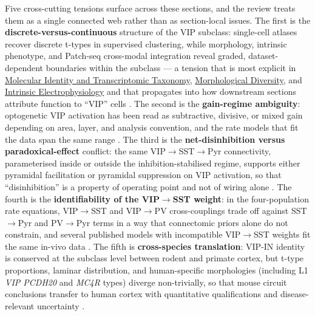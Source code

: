 \documentclass[11pt]{article}
\let\origrightarrow\rightarrow
\def\rightarrow{\ensuremath{\origrightarrow}}
\begin{document}
Five cross-cutting tensions surface across these sections, and the review treats them as a single connected web rather than as section-local issues. The first is the \textbf{discrete-versus-continuous} structure of the VIP subclass: single-cell atlases recover discrete t-types in supervised clustering, while morphology, intrinsic phenotype, and Patch-seq cross-modal integration reveal graded, dataset-dependent boundaries within the subclass --- a tension that is most explicit in \href{/classification}{Molecular Identity and Transcriptomic Taxonomy}, \href{/morphology}{Morphological Diversity}, and \href{/electrophysiology}{Intrinsic Electrophysiology} and that propagates into how downstream sections attribute function to ``VIP'' cells \citep{Tasic2016, Tasic2018, Pronneke2015, Apicella2022, Gouwens2020a, Schneidermizell2025, Emmenegger2018}. The second is the \textbf{gain-regime ambiguity}: optogenetic VIP activation has been read as subtractive, divisive, or mixed gain depending on area, layer, and analysis convention, and the rate models that fit the data span the same range \citep{Kuchibhotla2017, Hertag2019, Garciadelmolino2017, Litwinkumar2016, Veit2023, Bos2025, Tahvili2025a, Tahvili2025b}. The third is the \textbf{net-disinhibition versus paradoxical-effect} conflict: the same VIP\rightarrow SST\rightarrow Pyr connectivity, parameterised inside or outside the inhibition-stabilised regime, supports either pyramidal facilitation or pyramidal suppression on VIP activation, so that ``disinhibition'' is a property of operating point and not of wiring alone \citep{Garciadelmolino2017, Sanzeni2020, Reimann2026, Hertag2019, Tahvili2025a}. The fourth is the \textbf{identifiability of the VIP\rightarrow SST weight}: in the four-population rate equations, VIP\rightarrow SST and VIP\rightarrow PV cross-couplings trade off against SST\rightarrow Pyr and PV\rightarrow Pyr terms in a way that connectomic priors alone do not constrain, and several published models with incompatible VIP\rightarrow SST weights fit the same in-vivo data \citep{Hertag2019, Litwinkumar2016, Garciadelmolino2017, Veit2023, Reimann2026, Sabri2024}. The fifth is \textbf{cross-species translation}: VIP-IN identity is conserved at the subclass level between rodent and primate cortex, but t-type proportions, laminar distribution, and human-specific morphologies (including L1 \textit{VIP PCDH20} and \textit{MC4R} types) diverge non-trivially, so that mouse circuit conclusions transfer to human cortex with quantitative qualifications and disease-relevant uncertainty \citep{Hodge2019, Boldog2018, Chartrand2023, Bakken2021a, Bakken2021b, Krienen2020, Lee2023a}.
\end{document}
